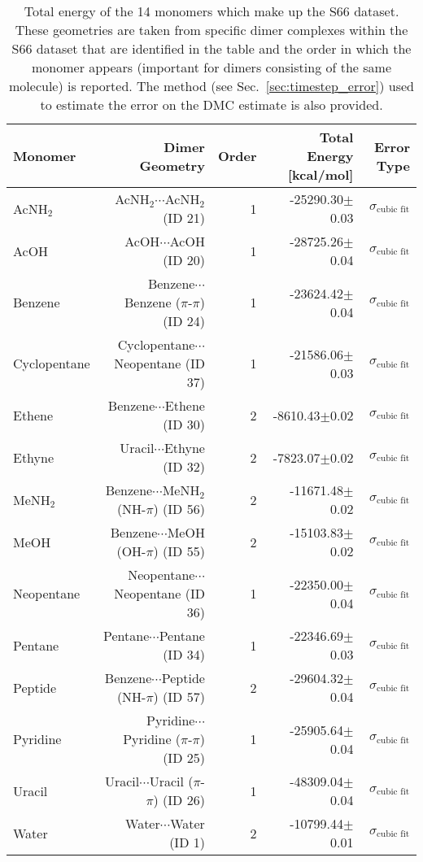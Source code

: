 \begin{table}
\caption{\label{tab:monomer_tot_ene}Total energy of the 14 monomers which make up the S66 dataset. These geometries are taken from specific dimer complexes within the S66 dataset that are identified in the table and the order in which the monomer appears (important for dimers consisting of the same molecule) is reported. The method (see Sec.~\ref{sec:timestep_error}) used to estimate the error on the DMC estimate is also provided.}
\begin{adjustbox}{center}
\begin{tabular}{lrrrr}
\toprule
Monomer & Dimer Geometry & Order & Total Energy [kcal/mol] & Error Type \\ 
\midrule
AcNH$_2$ & AcNH$_2$$\cdots$AcNH$_2$ (ID 21) & 1 & -25290.30$\pm$0.03 & $\sigma_\text{cubic fit}$ \\
AcOH & AcOH$\cdots$AcOH (ID 20) & 1 & -28725.26$\pm$0.04 & $\sigma_\text{cubic fit}$ \\
Benzene & Benzene$\cdots$Benzene ($\pi$-$\pi$) (ID 24) & 1 & -23624.42$\pm$0.04 & $\sigma_\text{cubic fit}$ \\
Cyclopentane & Cyclopentane$\cdots$Neopentane (ID 37) & 1 & -21586.06$\pm$0.03 & $\sigma_\text{cubic fit}$ \\
Ethene & Benzene$\cdots$Ethene (ID 30) & 2 & -8610.43$\pm$0.02 & $\sigma_\text{cubic fit}$ \\
Ethyne & Uracil$\cdots$Ethyne (ID 32) & 2 & -7823.07$\pm$0.02 & $\sigma_\text{cubic fit}$ \\
MeNH$_2$ & Benzene$\cdots$MeNH$_2$ (NH-$\pi$) (ID 56) & 2 & -11671.48$\pm$0.02 & $\sigma_\text{cubic fit}$ \\
MeOH & Benzene$\cdots$MeOH (OH-$\pi$) (ID 55) & 2 & -15103.83$\pm$0.02 & $\sigma_\text{cubic fit}$ \\
Neopentane & Neopentane$\cdots$Neopentane (ID 36) & 1 & -22350.00$\pm$0.04 & $\sigma_\text{cubic fit}$ \\
Pentane & Pentane$\cdots$Pentane (ID 34) & 1 & -22346.69$\pm$0.03 & $\sigma_\text{cubic fit}$ \\
Peptide & Benzene$\cdots$Peptide (NH-$\pi$) (ID 57) & 2 & -29604.32$\pm$0.04 & $\sigma_\text{cubic fit}$ \\
Pyridine & Pyridine$\cdots$Pyridine ($\pi$-$\pi$) (ID 25) & 1 & -25905.64$\pm$0.04 & $\sigma_\text{cubic fit}$ \\
Uracil & Uracil$\cdots$Uracil ($\pi$-$\pi$) (ID 26) & 1 & -48309.04$\pm$0.04 & $\sigma_\text{cubic fit}$ \\
Water & Water$\cdots$Water (ID 1) & 2 & -10799.44$\pm$0.01 & $\sigma_\text{cubic fit}$ \\
\bottomrule
\end{tabular}
\end{adjustbox}
\end{table}